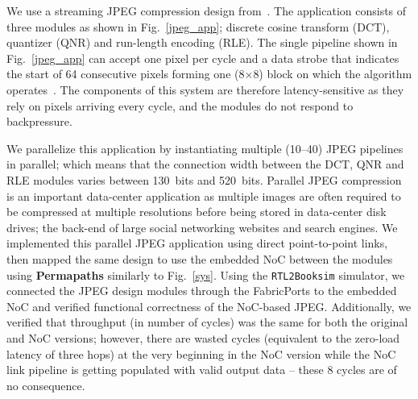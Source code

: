 %
%

%
%

We use a streaming JPEG compression design from~\cite{jpeg_opencore}.
The application consists of three modules as shown in Fig.~\ref{jpeg_app}; discrete cosine transform (DCT), quantizer (QNR) and run-length encoding (RLE).
The single pipeline shown in Fig.~\ref{jpeg_app} can accept one pixel per cycle and a data strobe that indicates the start of 64 consecutive pixels forming one (8$\times$8) block on which the algorithm operates~\cite{jpeg_opencore}.
The components of this system are therefore latency-sensitive as they rely on pixels arriving every cycle, and the modules do not respond to backpressure.

We parallelize this application by instantiating multiple (10--40) JPEG pipelines in parallel; which means that the connection width between the DCT, QNR and RLE modules varies between 130~bits and 520~bits.
Parallel JPEG compression is an important data-center application as multiple images are often required to be compressed at multiple resolutions before being stored in data-center disk drives; the back-end of large social networking websites and search engines.
We implemented this parallel JPEG application using direct point-to-point links, then mapped the same design to use the embedded NoC between the modules using \textbf{Permapaths} similarly to Fig.~\ref{sys}.
Using the \texttt{RTL2Booksim} simulator, we connected the JPEG design modules through the FabricPorts to the embedded NoC and verified functional correctness of the NoC-based JPEG.
Additionally, we verified that throughput (in number of cycles) was the same for both the original and NoC versions; however, there are  wasted cycles (equivalent to the zero-load latency of three hops) at the very beginning in the NoC version while the NoC link pipeline is getting populated with valid output data -- these 8 cycles are of no consequence.

